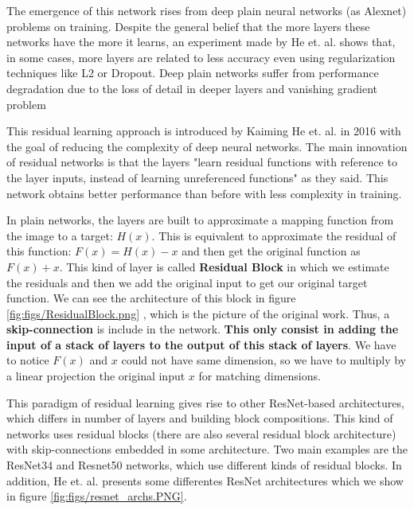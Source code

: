 The emergence of this network rises from deep plain neural networks (as Alexnet) problems on training.  Despite the general belief that the more layers these networks have the more it learns, an experiment made by He et. al. \cite{reslearning} shows that, in some cases, more layers are related to less accuracy even using regularization techniques like L2 or Dropout. Deep plain networks suffer from performance degradation due to the loss of detail in deeper layers and vanishing gradient problem

This residual learning approach is introduced by Kaiming He et. al. in 2016 \cite{reslearning} with the goal of reducing the complexity of deep neural networks. The main innovation of residual networks is that the layers "learn residual functions with reference to the layer inputs, instead of learning unreferenced functions" \cite{reslearning} as they said. This network obtains better performance than before with less complexity in training.

In plain networks, the layers are built to approximate a mapping function from the image to a target: $H(x)$. This is equivalent to approximate the residual of this function: $F(x) = H(x)-x$ and then get the original function as $F(x)+x$. This kind of layer is called \textbf{Residual Block} in which we estimate the residuals and then we add the original input to get our original target function. We can see the architecture of this block in figure \ref{fig:figs/ResidualBlock.png} , which is the picture of the original work. Thus, a \textbf{skip-connection} is include in the network. \textbf{This only consist in adding the input of a stack of layers to the output of this stack of layers}. We have to notice $F(x)$ and $x$ could not have same dimension, so we have to multiply by a linear projection the original input $x$ for matching dimensions. 



This paradigm of residual learning gives rise to other ResNet-based architectures, which differs in number of layers and building block compositions. This kind of networks uses residual blocks (there are also several residual block architecture) with skip-connections embedded in some architecture. Two main examples are the ResNet34 and Resnet50 networks, which use different kinds of residual blocks. In addition, He et. al. presents some differentes ResNet architectures which we show in figure \ref{fig:figs/resnet_archs.PNG}. 

